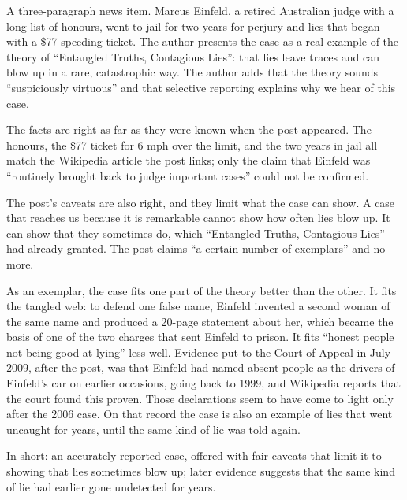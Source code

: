 \begin{afterword}
\summaryhead

A three-paragraph news item. Marcus Einfeld, a retired Australian judge with a long list of honours, went to jail for two years for perjury and lies that began with a \$77 speeding ticket. The author presents the case as a real example of the theory of ``Entangled Truths, Contagious Lies'': that lies leave traces and can blow up in a rare, catastrophic way. The author adds that the theory sounds ``suspiciously virtuous'' and that selective reporting explains why we hear of this case.

\responsehead

The facts are right as far as they were known when the post appeared. The honours, the \$77 ticket for 6 mph over the limit, and the two years in jail all match the Wikipedia article the post links; only the claim that Einfeld was ``routinely brought back to judge important cases'' could not be confirmed.

The post's caveats are also right, and they limit what the case can show. A case that reaches us because it is remarkable cannot show how often lies blow up. It can show that they sometimes do, which ``Entangled Truths, Contagious Lies'' had already granted. The post claims ``a certain number of exemplars'' and no more.

As an exemplar, the case fits one part of the theory better than the other. It fits the tangled web: to defend one false name, Einfeld invented a second woman of the same name and produced a 20-page statement about her, which became the basis of one of the two charges that sent Einfeld to prison. It fits ``honest people not being good at lying'' less well. Evidence put to the Court of Appeal in July 2009, after the post, was that Einfeld had named absent people as the drivers of Einfeld's car on earlier occasions, going back to 1999, and Wikipedia reports that the court found this proven. Those declarations seem to have come to light only after the 2006 case. On that record the case is also an example of lies that went uncaught for years, until the same kind of lie was told again.

In short: an accurately reported case, offered with fair caveats that limit it to showing that lies sometimes blow up; later evidence suggests that the same kind of lie had earlier gone undetected for years.
\end{afterword}
